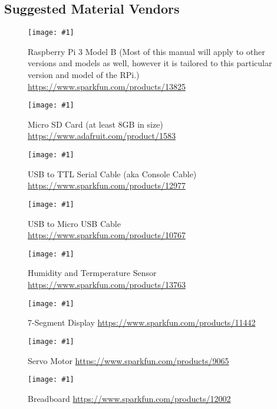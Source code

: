 \documentclass{article}
\newcommand{\imagefigs}[2]{
    \begin{figure}[H]
        \centering
        \texttt{[image: \#1]}
        \caption{#2}
    \end{figure}
}
\begin{document}
\begin{appendices}
  \subsection{Suggested Material Vendors}
    \imagefigs{resources/material-images/vendor-rpi}{Raspberry Pi 3 Model B (Most of this manual will apply to other versions and models as well, however it is tailored to this particular version and model of the RPi.) \href{https://www.sparkfun.com/products/13825}{https://www.sparkfun.com/products/13825} \label{sec:vendor-rpi}}

    \imagefigs{resources/material-images/vendor-micro-sd}{Micro SD Card (at least 8GB in size) \href{https://www.adafruit.com/product/1583}{https://www.adafruit.com/product/1583}
          \label{sec:vendor-sd}}
    \imagefigs{resources/material-images/vendor-ttl-serial-cable}{USB to TTL Serial Cable (aka Console Cable) \href{https://www.sparkfun.com/products/12977}{https://www.sparkfun.com/products/12977}
          \label{sec:vendor-usbttlserial}}
    \imagefigs{resources/material-images/vendor-usb-micro-cable}{USB to Micro USB Cable \href{https://www.sparkfun.com/products/10767}{https://www.sparkfun.com/products/10767}
          \label{sec:vendor-usbmusb}}
    \imagefigs{resources/material-images/vendor-si7021}{Humidity and Termperature Sensor \href{https://www.sparkfun.com/products/13763}{https://www.sparkfun.com/products/13763}
          \label{sec:vendor-sensor}}
    \imagefigs{resources/material-images/vendor-seg7}{7-Segment Display \href{https://www.sparkfun.com/products/11442}{https://www.sparkfun.com/products/11442}
          \label{sec:vendor-7seg}}
    \imagefigs{resources/material-images/vendor-servo}{Servo Motor \href{https://www.sparkfun.com/products/9065}{https://www.sparkfun.com/products/9065}
          \label{sec:vendor-servo}}
    \imagefigs{resources/material-images/vendor-breadboard}{Breadboard \href{https://www.sparkfun.com/products/12002}{https://www.sparkfun.com/products/12002}
          \label{sec:vendor-breadboard}}

\end{appendices}
\end{document}
